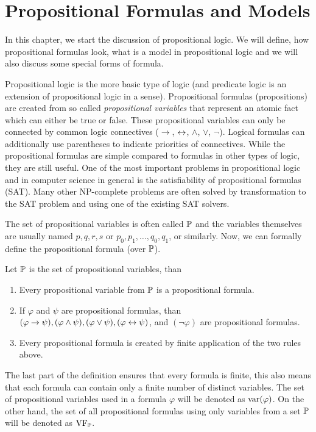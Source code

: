 
\chapter{Propositional Formulas and Models}

In this chapter, we start the discussion of propositional logic. We will define, how propositional formulas look, what is a model in propositional logic and we will also discuss some special forms of formula.

Propositional logic is the more basic type of logic (and predicate logic is an extension of propositional logic in a sense).  Propositional formulas (propositions) are created from so called \emph{propositional variables} that represent an atomic fact which can either be true or false. These propositional variables can only be connected by common logic connectives ($\to$, $\leftrightarrow$, $\land$, $\lor$, $\neg$). Logical formulas can additionally use parentheses to indicate priorities of connectives. While the propositional formulas are simple compared to formulas in other types of logic, they are still useful. One of the most important problems in propositional logic and in computer science in general is the satisfiability of propositional formulas (SAT). Many other NP-complete problems are often solved by transformation to the SAT problem and using one of the existing SAT solvers.

The set of propositional variables is often called $\mathbb{P}$ and the variables themselves are usually named $p, q, r, s$ or $p_0, p_1, \dots, q_0, q_1$, or similarly. Now, we can formally define the propositional formula (over $\mathbb{P}$).

\begin{definition}
Let $\mathbb{P}$ is the set of propositional variables, than
\begin{enumerate}
  \item Every propositional variable from $\mathbb{P}$ is a propositional formula.
  \item If $\varphi$ and $\psi$ are propositional formulas, than $(\varphi \to \psi), (\varphi \land \psi), (\varphi \lor \psi), (\varphi \leftrightarrow \psi)$, and $(\neg \varphi)$ are propositional formulas.
  \item Every propositional formula is created by finite application of the two rules above.
\end{enumerate}
\end{definition}

The last part of the definition ensures that every formula is finite, this also means that each formula can contain only a finite number of distinct variables. The set of propositional variables used in a formula $\varphi$ will be denoted as $\operatorname{var}(\varphi)$. On the other hand, the set of all propositional formulas using only variables from a set $\mathbb{P}$ will be denoted as $\operatorname{VF}_\mathbb{P}$.

